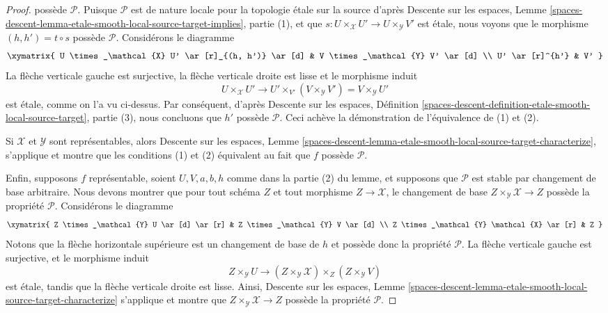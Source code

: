 \begin{proof}
possède $\mathcal{P}$. Puisque $\mathcal{P}$ est de nature locale pour la topologie \'etale sur la source d'après
Descente sur les espaces, Lemme
\ref{spaces-descent-lemma-etale-smooth-local-source-target-implies}, partie (1),
et que $s : U \times_\mathcal{X} U' \to U \times_\mathcal{Y} V'$ est \'etale,
nous voyons que le morphisme $(h, h') = t \circ s$ possède $\mathcal{P}$.
Considérons le diagramme
$$
\xymatrix{
U \times_\mathcal{X} U' \ar[r]_{(h, h')} \ar[d] &
V \times_\mathcal{Y} V' \ar[d] \\
U' \ar[r]^{h'} & V'
}
$$
La flèche verticale gauche est surjective, la flèche verticale droite est lisse et
le morphisme induit
$$
U \times_\mathcal{X} U'
\longrightarrow
U' \times_{V'} (V \times_\mathcal{Y} V') = V \times_\mathcal{Y} U'
$$
est \'etale, comme on l'a vu ci-dessus. Par conséquent, d'après
Descente sur les espaces, Définition
\ref{spaces-descent-definition-etale-smooth-local-source-target}, partie (3),
nous concluons que $h'$ possède $\mathcal{P}$. Ceci achève la démonstration de
l'équivalence de (1) et (2).

\medskip\noindent
Si $\mathcal{X}$ et $\mathcal{Y}$ sont représentables, alors
Descente sur les espaces,
Lemme \ref{spaces-descent-lemma-etale-smooth-local-source-target-characterize},
s'applique et montre que les conditions (1) et (2) équivalent au fait que $f$ possède
$\mathcal{P}$.

\medskip\noindent
Enfin, supposons $f$ représentable, soient $U, V, a, b, h$
comme dans la partie (2) du lemme, et supposons que $\mathcal{P}$ est stable par
changement de base arbitraire. Nous devons montrer que pour tout schéma
$Z$ et tout morphisme $Z \to \mathcal{X}$, le changement de base
$Z \times_\mathcal{Y} \mathcal{X} \to Z$
possède la propriété $\mathcal{P}$. Considérons le diagramme
$$
\xymatrix{
Z \times_\mathcal{Y} U \ar[d] \ar[r] &
Z \times_\mathcal{Y} V \ar[d] \\
Z \times_\mathcal{Y} \mathcal{X} \ar[r] &
Z
}
$$
Notons que la flèche horizontale supérieure est un changement de base de $h$ et
possède donc la propriété $\mathcal{P}$. La flèche verticale gauche est
surjective, et le morphisme induit
$$
Z \times_\mathcal{Y} U \longrightarrow
(Z \times_\mathcal{Y} \mathcal{X}) \times_Z (Z \times_\mathcal{Y} V)
$$
est \'etale, tandis que la flèche verticale droite est lisse. Ainsi,
Descente sur les espaces,
Lemme \ref{spaces-descent-lemma-etale-smooth-local-source-target-characterize}
s'applique et montre que $Z \times_\mathcal{Y} \mathcal{X} \to Z$
possède la propriété $\mathcal{P}$.
\end{proof}

